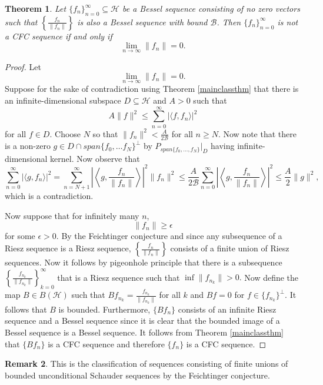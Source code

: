 \documentclass[11pt]{amsart}
\newtheorem{thm}{Theorem}[section]
\theoremstyle{definition}
\newtheorem{rem}[thm]{Remark}
\numberwithin{equation}{section}
\newcommand{\Hcal}{\mathcal{H}} %
\begin{document}
\begin{thm}
 Let $\{f_n\}_{n=0}^{\infty}\subseteq \Hcal$ be a Bessel sequence consisting of no zero vectors such that $\left\{\frac{f_n}{\|f_n\| } \right\}$ is also a Bessel sequence with bound $\mathcal{B}$. Then $\{f_n\}_{n=0}^{\infty}$ is not a CFC sequence if and only if $$\lim_{n\to \infty}\|f_n\|=0.$$
\end{thm}
\begin{proof}
Let $$\lim_{n\to \infty}\|f_n\|=0.$$ Suppose for the sake of contradiction using Theorem \ref{mainclassthm} that there is an infinite-dimensional subspace $D\subseteq \Hcal$ and $A>0$ such that
$$A\|f\|^{2}\leq \sum_{n=0}^{\infty}|\langle f, f_n\rangle|^{2}$$ for all $f\in D.$ Choose $N$ so that $\|f_{n}\|^{2}<\frac{A}{2\mathcal{B}}$ for all $n\geq N$.
Now note that there is a non-zero $g\in D\cap span\{f_{0},\dots f_{N}\}^{\perp}$ by $P_{span\{f_{0},\dots ,f_{N}\}}|_{D}$ having infinite-dimensional kernel.
Now observe that
$$\sum_{n=0}^{\infty}|\langle g,f_n\rangle|^{2}=\sum_{n=N+1}^{\infty}\left|\left\langle g,\frac{f_n}{\|f_n\|} \right\rangle \right|^{2}\|f_n\|^{2}\leq \frac{A}{2\mathcal{B}} \sum_{n=0}^{\infty}\left|\left\langle g,\frac{f_n}{\|f_n\|} \right\rangle \right|^{2}\leq \frac{A}{2} \|g\|^{2},$$ which is a contradiction.

Now suppose that for infinitely many $n$, $$\|f_n\|\geq \epsilon$$ for some $\epsilon>0$.
By the Feichtinger conjecture and since any subsequence of a Riesz sequence is a Riesz sequence, $\left\{\frac{f_n}{\|f_n\|} \right\}$ consists of a finite union of Riesz sequences. Now it follows by pigeonhole principle that there is a subsequence $\left\{\frac{f_{n_{k}}}{\|f_{n_k}\| } \right\}_{k=0}^{\infty}$ that is a Riesz sequence such that $\inf\|f_{n_k}\|>0.$ Now define the map $B\in B(\Hcal)$ such that  $Bf_{n_k}= \frac{f_{n_{k}}}{\|f_{n_k}\| }$ for all $k$ and
$Bf=0$ for
$f\in \{f_{n_{k}}\}^{\perp}$. It follows that $B$ is bounded. Furthermore, $\{Bf_n\}$ consists of an infinite Riesz sequence and a Bessel sequence since it is clear that the bounded image of a Bessel sequence is a Bessel sequence. It follows from Theorem \ref{mainclassthm} that $\{Bf_n\}$ is a CFC sequence and therefore $\{f_n\}$ is a CFC sequence.
\end{proof}

\begin{rem}
This is the classification of sequences consisting of finite unions of bounded unconditional Schauder sequences by the Feichtinger conjecture.
\end{rem}
\end{document}
